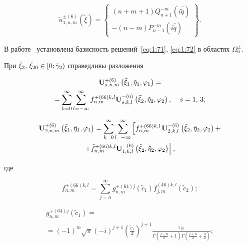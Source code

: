 \begin{equation}\label{eq:1:77}
\tilde u_{1,n,m}^{ \pm (6)}(\tilde \xi ) = \left\{ \begin{array}{l}
(n + m + 1)Q_{n + 1}^{ - m}(i\bar \tilde q)\\
 - (n - m)P_{n - 1}^{ - m}(i\bar \tilde q)
\end{array} \right\}.
\end{equation}

В работе~\cite{Nikolaev1998} установлена базисность решений~\eqref{eq:1:71}, \eqref{eq:1:72} в областях $\Omega _6^ \pm $.

\begin{theorem}
При ${\tilde \xi _2},{\mkern 1mu} {\kern 1pt} {\tilde \xi _{20}} \in \left[ {0;{{\tilde \gamma }_2}} \right)$ справедливы разложения

\begin{multline}\label{eq:1:78}
{\bf{U}}_{s,n,m}^{ + (6)}\left( {{{\tilde \xi }_1},{{\tilde \eta }_1},{\varphi _1}} \right) = \\
= \sum\limits_{k = 0}^\infty  {\sum\limits_{l =  - \infty }^\infty  {f_{n,m}^{ + (66)k,l}} } {\bf{U}}_{s,k,l}^{ - (6)}\left( {{{\tilde \xi }_2},{{\tilde \eta }_2},{\varphi _2}} \right), \quad {\kern 1pt} s = 1,{\mkern 1mu} {\kern 1pt} 3;
\end{multline}

\begin{multline}\label{eq:1:79}
{\bf{U}}_{2,n,m}^{ + (6)}\left( {{{\tilde \xi }_1},{{\tilde \eta }_1},{\varphi _1}} \right) = \sum\limits_{k = 0}^\infty  {\sum\limits_{l =  - \infty }^\infty  {\left[ {f_{n,m}^{ + (66)k,l}} \right.} } {\bf{U}}_{2,k,l}^{ - (6)}\left( {{{\tilde \xi }_2},{{\tilde \eta }_2},{\varphi _2}} \right) + \\
\left. { + \tilde f_{n,m}^{ + (66)k,l}{\bf{U}}_{1,k,l}^{ - (6)}\left( {{{\tilde \xi }_2},{{\tilde \eta }_2},{\varphi _2}} \right)} \right],
\end{multline}

\noindent где

\begin{equation}\label{eq:1:80}
f_{n,m}^{ + (66)k,l} = \sum\limits_{j = n}^\infty  {g_{n,m}^{ + (64)j}} ({\tilde c_1})f_{j,m}^{(46)k,l}({\tilde c_2});
\end{equation}

\begin{multline}\label{eq:1:81}
g_{n,m}^{ + (64)j}({\tilde c_1}) = \\
= {( - 1)^m}\sqrt \pi  {( - i)^{j + 1}}{\left( {\frac{{{{\tilde c}_1}}}{2}} \right)^{j + 1}}\frac{{{\varepsilon _{jn}}}}{{\Gamma \left( {\frac{{j - n}}{2} + 1} \right)\Gamma \left( {\frac{{j + n}}{2} + \frac{3}{2}} \right)}};
\end{multline}


\end{theorem}
